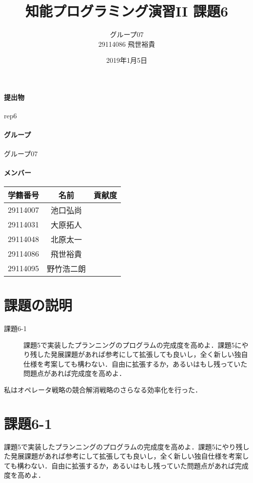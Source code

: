 \documentclass[a4j]{jarticle}
\title{知能プログラミング演習II 課題6}
\author{グループ07\\
  29114086 飛世裕貴\\
}
\date{2019年1月5日}
\begin{document}
\maketitle

\paragraph{提出物} rep6
\paragraph{グループ} グループ07
\paragraph{メンバー}
\begin{tabular}{|c|c|c|}
  \hline\hline
  学籍番号&名前&貢献度\\
  \hline\hline
  29114007&池口弘尚&\\
  \hline
  29114031&大原拓人&\\
  \hline
  29114048&北原太一&\\
  \hline
  29114086&飛世裕貴&\\
  \hline
  29114095&野竹浩二朗&\\
  \hline
\end{tabular}



\section{課題の説明}
\begin{description}
\item[課題6-1] 課題5で実装したプランニングのプログラムの完成度を高めよ．課題5にやり残した発展課題があれば参考にして拡張しても良いし，全く新しい独自仕様を考案しても構わない．自由に拡張するか，あるいはもし残っていた問題点があれば完成度を高めよ．

\end{description}
私はオペレータ戦略の競合解消戦略のさらなる効率化を行った．
\section{課題6-1}
\begin{screen}
課題5で実装したプランニングのプログラムの完成度を高めよ．課題5にやり残した発展課題があれば参考にして拡張しても良いし，全く新しい独自仕様を考案しても構わない．自由に拡張するか，あるいはもし残っていた問題点があれば完成度を高めよ．
\end{screen}
\end{document}
